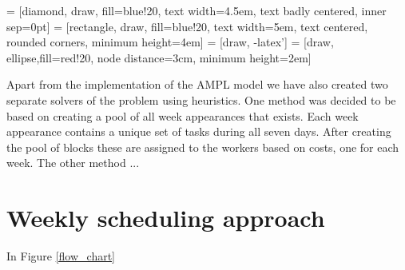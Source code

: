  = [diamond, draw, fill=blue!20, 
    text width=4.5em, text badly centered, inner sep=0pt]
 = [rectangle, draw, fill=blue!20, 
    text width=5em, text centered, rounded corners, minimum height=4em]
 = [draw, -latex']
 = [draw, ellipse,fill=red!20, node distance=3cm,
    minimum height=2em]


Apart from the implementation of the AMPL model we have also created two separate solvers of the problem using heuristics. One method was decided to be based on creating a pool of all week appearances that exists. Each week appearance contains a unique set of tasks during all seven days. After creating the pool of blocks these are assigned to the workers based on costs, one for each week. The other method ...

\section{Weekly scheduling approach} \label{Weekly}
In Figure \ref{flow_chart}

